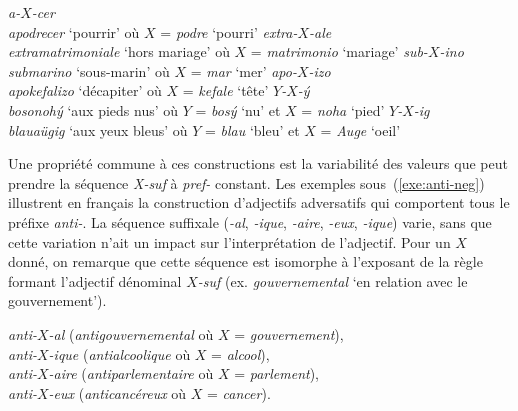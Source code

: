 \documentclass[output=paper]{langsci/langscibook}
\begin{document}
\begin{exe}
\ex \begin{xlist}
\ex\label{exe:por} \emph{\mbox{a-$X$-cer}}\\ \emph{apodrecer} `pourrir' où $X$ = \emph{podre} `pourri'
\ex\label{exe:ita} \emph{\mbox{extra-$X$-ale}}\\\emph{extramatrimoniale} `hors mariage' où  $X$ = \emph{matrimonio} `mariage'
\ex\label{exe:esp} \emph{\mbox{sub-$X$-ino}} \\\emph{submarino} `sous-marin' où $X$ = \emph{mar} `mer'
\ex\label{exe:gre}\emph{\mbox{apo-$X$-izo}} \\ \emph{apokefalizo}  `décapiter' où $X$ = \emph{kefale} `tête'
\ex\label{exe:slo}\emph{\mbox{$Y$-$X$-\'{y}}} \\  \emph{bosonoh\'{y}} `aux pieds nus' où $Y$ = \emph{bos\'{y}} `nu' et $X$ = \emph{noha} `pied'
\ex\label{exe:all}\emph{\mbox{$Y$-$X$-ig}}\\ \emph{blauaügig} `aux yeux bleus' où $Y$ = \emph{blau} `bleu' et $X$ = \emph{Auge} `oeil'
\end{xlist}
\end{exe}


Une propriété commune à ces constructions est la variabilité des valeurs que peut prendre la séquence \emph{\mbox{X-suf}} à \emph{\mbox{pref-}} constant. Les exemples sous~(\ref{exe:anti-neg}) illustrent en français la construction d'adjectifs adversatifs qui comportent tous le préfixe \emph{\mbox{anti-}}. La séquence suffixale (\emph{\mbox{-al}}, \emph{\mbox{-ique}}, \emph{\mbox{-aire}}, \emph{\mbox{-eux}}, \emph{\mbox{-ique}}) varie, sans que cette variation n'ait un impact sur l'interprétation de l'adjectif.  Pour un $X$ donné, on remarque que cette séquence  est isomorphe à l'exposant de la règle formant l'adjectif dénominal  \emph{\mbox{$X$-suf}} (ex. \emph{gouvernemental} `en relation avec le gouvernement').



\begin{exe}
\ex\label{exe:anti-neg}
\emph{\mbox{anti-$X$-al}} (\emph{antigouvernemental} où $X$ = \emph{gouvernement}),\\
\emph{\mbox{anti-$X$-ique}} (\emph{antialcoolique} où $X$ = \emph{alcool}),\\
\emph{\mbox{anti-$X$-aire}} (\emph{antiparlementaire} où $X$ = \emph{parlement}),\\
\emph{\mbox{anti-$X$-eux}} (\emph{anticancéreux} où $X$ = \emph{cancer}).
\end{exe}
\end{document}

